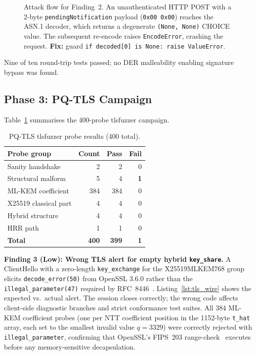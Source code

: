 \documentclass[final,3p,times,twocolumn]{elsarticle}
\begin{document}
\begin{figure}[h]
\caption{Attack flow for Finding~2. An unauthenticated HTTP POST with a 2-byte
\texttt{pendingNotification} payload (\texttt{0x00~0x00}) reaches the ASN.1
decoder, which returns a degenerate \texttt{(None,~None)} CHOICE value.
The subsequent re-encode raises \texttt{EncodeError}, crashing the request.
\textbf{Fix:} guard \texttt{if decoded[0] is None: raise ValueError}.}
\label{fig:attack2}
\end{figure}

Nine of ten round-trip tests passed; no DER malleability enabling
signature bypass was found.

\subsection{Phase 3: PQ-TLS Campaign}

Table~\ref{tab:tls} summarises the 400-probe tlsfuzzer campaign.

\begin{table}[h]
\centering
\caption{PQ-TLS tlsfuzzer probe results (400 total).}
\label{tab:tls}
\begin{tabular}{@{}lrrr@{}}
\toprule
Probe group & Count & Pass & Fail \\
\midrule
Sanity handshake      & 2   & 2   & 0 \\
Structural malform    & 5   & 4   & \textbf{1} \\
ML-KEM coefficient    & 384 & 384 & 0 \\
X25519 classical part & 4   & 4   & 0 \\
Hybrid structure      & 4   & 4   & 0 \\
HRR path              & 1   & 1   & 0 \\
\midrule
\textbf{Total}        & \textbf{400} & \textbf{399} & \textbf{1} \\
\bottomrule
\end{tabular}
\end{table}

\textbf{Finding 3 (Low): Wrong TLS alert for empty hybrid \texttt{key\_share}.}
A ClientHello with a zero-length \texttt{key\_exchange} for the
X25519MLKEM768 group elicits \texttt{decode\_error(50)} from OpenSSL 3.6.0
rather than the \texttt{illegal\_parameter(47)} required by RFC~8446~\cite{rfc8446}.
Listing~\ref{lst:tls_wire} shows the expected vs.\ actual alert.
The session closes correctly; the wrong code affects client-side diagnostic
branches and strict conformance test suites.
All 384 ML-KEM coefficient probes (one per NTT coefficient position in the
1152-byte \texttt{t\_hat} array, each set to the smallest invalid value
$q = 3329$) were correctly rejected with \texttt{illegal\_parameter},
confirming that OpenSSL's FIPS~203 range-check~\cite{nist_fips203} executes
before any memory-sensitive decapsulation.
\end{document}
